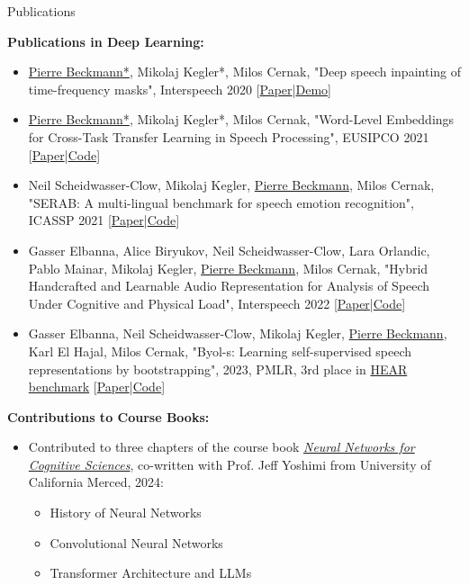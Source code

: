 \documentclass[]{mcdowellcv}
\begin{document}
\begin{cvsection}{Publications}
\begin{cvsubsection}{}{}{}
        \vspace{0.1cm}
        \textbf{Publications in Deep Learning:} \vspace{0.1cm}
        \begin{itemize}
        \setlength\itemsep{0.4em}
            \item \underline{Pierre Beckmann*}, Mikolaj Kegler*, Milos Cernak, "Deep speech inpainting of time-frequency masks", Interspeech 2020 [\href{https://arxiv.org/abs/1910.09058}{Paper}|\href{https://mkegler.github.io/SpeechInpainting/}{Demo}]
            \item \underline{Pierre Beckmann*}, Mikolaj Kegler*, Milos Cernak, "Word-Level Embeddings for Cross-Task Transfer Learning in Speech Processing", EUSIPCO 2021 [\href{https://arxiv.org/abs/1910.09909}{Paper}|\href{https://github.com/bepierre/SpeechVGG}{Code}]
            \item Neil Scheidwasser-Clow, Mikolaj Kegler, \underline{Pierre Beckmann}, Milos Cernak, "SERAB: A multi-lingual benchmark for speech emotion recognition", ICASSP 2021 [\href{https://arxiv.org/abs/2110.03414}{Paper}|\href{https://github.com/neclow/serab}{Code}]
            \item Gasser Elbanna, Alice Biryukov, Neil Scheidwasser-Clow, Lara Orlandic, Pablo Mainar, Mikolaj Kegler, \underline{Pierre Beckmann}, Milos Cernak, "Hybrid Handcrafted and Learnable Audio Representation for Analysis of Speech Under Cognitive and Physical Load", Interspeech 2022 [\href{https://arxiv.org/abs/2203.16637}{Paper}|\href{https://github.com/GasserElbanna/serab-byols}{Code}]
            \item Gasser Elbanna, Neil Scheidwasser-Clow, Mikolaj Kegler, \underline{Pierre Beckmann}, Karl El Hajal, Milos Cernak, "Byol-s: Learning self-supervised speech representations by bootstrapping", 2023, PMLR, 3rd place in \href{https://hearbenchmark.com/hear-leaderboard.html}{HEAR benchmark} [\href{https://arxiv.org/abs/2206.12038}{Paper}|\href{https://github.com/GasserElbanna/serab-byols}{Code}]
        \end{itemize}

        \vspace{0.1cm}
        \textbf{Contributions to Course Books:} \vspace{0.1cm}
        \begin{itemize}
            \item Contributed to three chapters of the course book \href{https://github.com/simbrain/NeuralNetworksCogSciBook}{\textit{Neural Networks for Cognitive Sciences}}, co-written with Prof. Jeff Yoshimi from University of California Merced, 2024:
            \begin{itemize}
                \item History of Neural Networks
                \item Convolutional Neural Networks
                \item Transformer Architecture and LLMs
            \end{itemize}
        \end{itemize}


\end{cvsubsection}
\end{cvsection}
\end{document}
